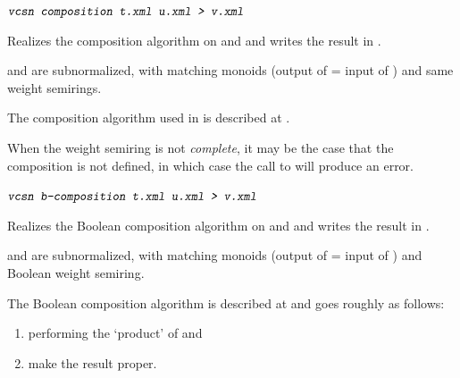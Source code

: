 \SetTwClPrm{\TwClThree}%
\begin{SwClCmd}
\begin{shell}
$ \textsl{\texttt{vcsn composition t.xml u.xml > v.xml}}
$
\end{shell}%
\end{SwClCmd}%
\begin{SwClTxt}
    Realizes the composition algorithm on 
     and  and writes the result in  
    . 
\end{SwClTxt}%
%


\Prec {} and  are subnormalized, with matching 
monoids (output of  = input of ) and same 
weight semirings.

\longclear
\Spec
The composition algorithm used in \tafkit 
is described at .

\Comt
When the weight semiring is not \emph{complete}, it may be the case 
that the composition is not defined, in which case the call to 
 will produce an error.

% 
%     


\medskip\medskip 
\begin{SwClCmd}
\begin{shell}
$ \textsl{\texttt{vcsn b-composition t.xml u.xml > v.xml}}
$
\end{shell}%
\end{SwClCmd}%
\begin{SwClTxt}
    Realizes the Boolean composition algorithm on 
     and  and writes the result in  
    . 
\end{SwClTxt}%
%


\Prec {} and  are subnormalized, with matching 
monoids (output of  = input of ) and Boolean 
weight semiring.

\Spec
The Boolean composition algorithm is described at  and goes 
roughly as follows: 
\begin{enumerate}
    \item  performing the `product' of  and 

    \item  make the result proper.
\end{enumerate}

